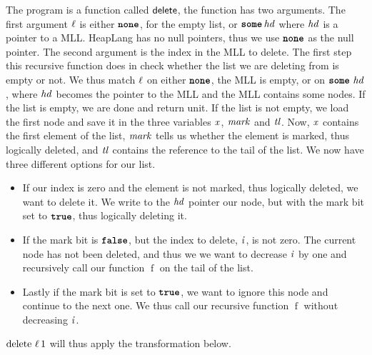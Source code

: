 \documentclass[thesis.tex]{subfiles}
\begin{document}
The program is a function called $\textsf{\upshape delete}$, the function has two arguments. The first argument $\ell$ is either $\operatorname{\texttt{\bfseries none}}$, for the empty list, or $\operatorname{\texttt{\bfseries some}} \mathit{hd}$ where $\mathit{hd}$ is a pointer to a MLL. HeapLang has no null pointers, thus we use $\operatorname{\texttt{\bfseries none}}$ as the null pointer. The second argument is the index in the MLL to delete. The first step this recursive function does in check whether the list we are deleting from is empty or not. We thus match $\ell$ on either $\operatorname{\texttt{\bfseries none}}$, the MLL is empty, or on $\operatorname{\texttt{\bfseries some}}\,\mathit{hd}$, where $\mathit{hd}$ becomes the pointer to the MLL and the MLL contains some nodes. If the list is empty, we are done and return unit. If the list is not empty, we load the first node and save it in the three variables $\mathit{x}$, $\mathit{mark}$ and $\mathit{tl}$. Now, $\mathit{x}$ contains the first element of the list, $\mathit{mark}$ tells us whether the element is marked, thus logically deleted, and $\mathit{tl}$ contains the reference to the tail of the list. We now have three different options for our list.
\begin{itemize}
  \item If our index is zero and the element is not marked, thus logically deleted, we want to delete it. We write to the $\mathit{hd}$ pointer our node, but with the mark bit set to $\texttt{\bfseries true}$, thus logically deleting it.
  \item If the mark bit is $\texttt{\bfseries false}$, but the index to delete, $\mathit{i}$, is not zero. The current node has not been deleted, and thus we  we want to decrease $\mathit{i}$ by one and recursively call our function $\operatorname{f}$ on the tail of the list.
  \item Lastly if the mark bit is set to $\texttt{\bfseries true}$, we want to ignore this node and continue to the next one. We thus call our recursive function $\operatorname{f}$ without decreasing $\mathit{i}$.
\end{itemize}
$\operatorname{delete}\, \ell\, 1$ will thus apply the transformation below.
\end{document}
